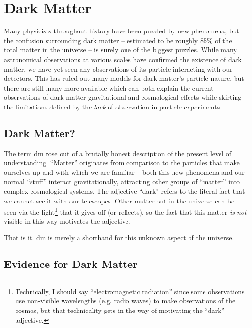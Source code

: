 \chapter{Dark Matter}
\label{chapter:dm}

Many physicists throughout history have been puzzled by new phenomena, but the confusion
surrounding dark matter -- estimated to be roughly 85\% of the total matter in the universe -- is
surely one of the biggest puzzles. While many astronomical observations at various scales have
confirmed the existence of dark matter, we have yet seen any observations of its particle
interacting with our detectors. This has ruled out many models for dark matter's particle nature,
but there are still many more available which can both explain the current observations of dark
matter gravitational and cosmological effects while skirting the limitations defined by the
\emph{lack} of observation in particle experiments.

\section{Dark Matter?}
The term \ac{dm} rose out of a brutally honest description of the present level of understanding.
``Matter'' originates from comparison to the particles that make ourselves up and
with which we are familiar -- both this new phenomena and our normal ``stuff'' interact gravitationally,
attracting other groups of ``matter'' into complex cosmological systems.
The adjective ``dark'' refers to the literal fact that we cannot
see it with our telescopes. Other matter out in the universe can be seen via the light\footnote{
	Technically, I should say ``electromagnetic radiation'' since some observations use non-visible
	wavelengths (e.g. radio waves) to make observations of the cosmos, but that technicality gets in
	the way of motivating the ``dark'' adjective. } that it gives off (or reflects), so the fact that
this matter \emph{is not} visible in this way motivates the adjective.

That is it. \acf{dm} is merely a shorthand for this unknown aspect of the universe.

\section{Evidence for Dark Matter}
\label{sec:dm:evidence}

